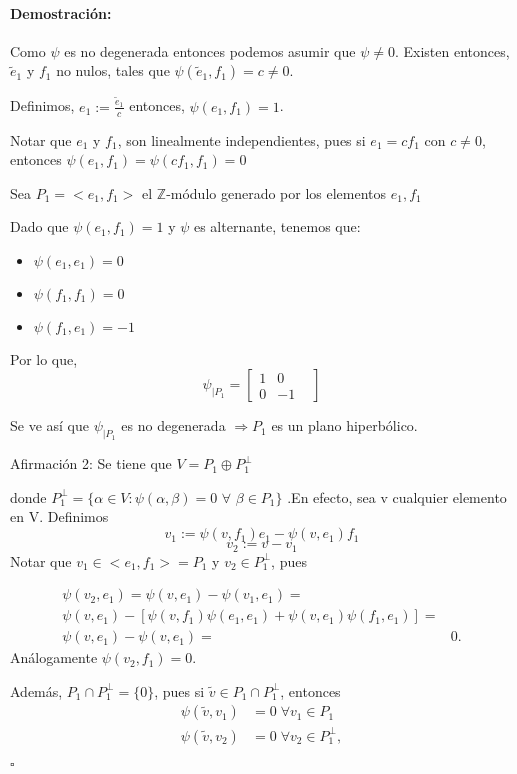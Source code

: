 \documentclass[12pt]{article}
\newenvironment{proof}{\paragraph{Demostración:}}{\hfill$\square$}
\begin{document}
\begin{proof}
Como $\psi$ es no degenerada entonces podemos asumir que $\psi \neq 0$.
Existen entonces, $\tilde{e}_1$ y $f_1$ no nulos, tales que $\psi(\tilde{e}_1,f_1)=c\neq0$.

Definimos, $e_1:=\frac{\tilde{e}_1}{c}$ entonces, $\psi(e_1,f_1)=1$.

Notar que $e_1$ y $f_1$, son linealmente independientes, pues si $e_1=c f_1$ con $c\neq 0$,
entonces $\psi(e_1,f_1)=\psi(c f_1,f_1)=0$


Sea $P_1=<e_1,f_1>$ el $\mathbb{Z}$-módulo generado por los elementos $e_1,f_1$
    
Dado que $\psi(e_1,f_1)=1$ y $\psi$ es alternante, tenemos que:
\begin{itemize}
 \item $\psi(e_1,e_1)=0$
 \item $\psi(f_1,f_1)=0$
 \item $\psi(f_1,e_1)=-1$
\end{itemize}

Por lo que, 
$$\psi_{|P_1} = 
\begin{bmatrix}
 1 & 0 &\\ 
 0& -1&
\end{bmatrix}
$$

Se ve así que $\psi_{|P_1}$ es no degenerada $\Rightarrow P_1$ es un plano hiperbólico.
\newline

Afirmación 2: Se tiene que  $V = P_1 \oplus P_1^{\bot}$

 donde $P_1^{\bot}= \{ \alpha \in V: \psi(\alpha,\beta)=0$  $\forall$  $\beta \in P_1 \} $ .En efecto,  
 sea v cualquier elemento en V.
 Definimos 
 $$v_1:=\psi(v,f_1)e_1-\psi(v,e_1)f_1$$
 $$v_2:=v-v_1$$
 Notar que $v_1 \in <e_1,f_1>=P_1$ y $v_2 \in P_1^{\bot}$, pues 
 
 $$\begin{aligned}
 \psi(v_2,e_1)=\psi(v,e_1)-\psi(v_1,e_1)=&\\
 \psi (v,e_1)-[\psi(v,f_1) \psi(e_1,e_1) + \psi(v,e_1) \psi(f_1,e_1)]=&\\
 \psi(v,e_1)- \psi(v,e_1)=&0.
 \end{aligned}$$
 Análogamente $\psi(v_2,f_1)=0$.
 
 
 Además, $P_1  \cap P_1^{\bot} = \{0\}$, pues si  $\tilde{v} \in  P_1 \cap P_1^{\bot}$, entonces
 $$\begin{aligned}
 \psi(\tilde{v},v_1)&=0 \;\forall v_1 \in P_1\\ 
 \psi(\tilde{v},v_2)&=0 \;\forall v_2 \in P_1^{\bot},
 \end{aligned}$$
 

\end{proof}
\end{document}
